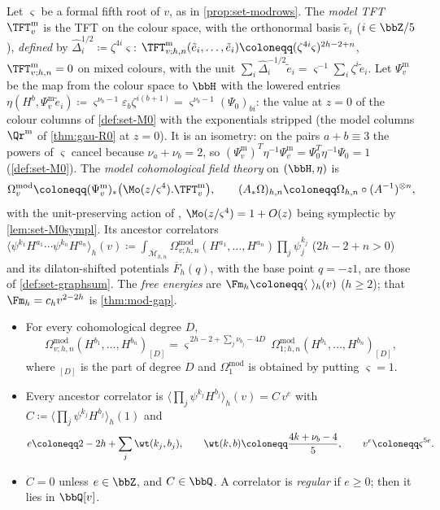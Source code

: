 \begin{defn}
\label{def:set-modcohft}
Let $\varsigma$ be a formal fifth root of $v$, as in \cref{prop:set-modrows}. The \emph{model TFT} $\TFT^{\mathrm m}_v$ is the TFT on the colour space, with the orthonormal basis $\tilde e_i$ ($i\in\bbZ/5$), \emph{defined} by $\hat\Delta_i^{1/2}\coloneqq\zeta^{4i}\varsigma$: $\TFT^{\mathrm m}_{v;h,n}(\tilde e_i,\dots,\tilde e_i)\coloneqq(\zeta^{4i}\varsigma)^{2h-2+n}$, $\TFT^{\mathrm m}_{v;h,n}=0$ on mixed colours, with the unit $\sum_i\hat\Delta_i^{-1/2}\tilde e_i=\varsigma^{-1}\sum_i\zeta^i\tilde e_i$. Let $\Psi^{\mathrm m}_v$ be the map from the colour space to $\bbH$ with the lowered entries $\eta(H^b,\Psi^{\mathrm m}_v\tilde e_i)\coloneqq\varsigma^{\nu_b-1}\varepsilon_b\zeta^{i(b+1)}=\varsigma^{\nu_b-1}(\Psi_0)_{bi}$: the value at $z=0$ of the colour columns of \cref{def:set-M0} with the exponentials stripped (the model columns $\Qr^{\mathrm m}$ of \cref{thm:gau-R0} at $z=0$). It is an isometry: on the pairs $a+b\equiv3$ the powers of $\varsigma$ cancel because $\nu_a+\nu_b=2$, so $(\Psi^{\mathrm m}_v)^T\eta^{-1}\Psi^{\mathrm m}_v=\Psi_0^T\eta^{-1}\Psi_0=1$ (\cref{def:set-M0}). The \emph{model cohomological field theory} on $(\bbH,\eta)$ is
\[
\Omega^{\mathrm{mod}}_v\coloneqq(\Psi^{\mathrm m}_v)_*\bigl(\Mo(z/\varsigma^4).\TFT^{\mathrm m}_v\bigr),\qquad(A_*\Omega)_{h,n}\coloneqq\Omega_{h,n}\circ(A^{-1})^{\otimes n},
\]
with the unit-preserving action of \cite[Defs.~2.5, 2.13]{PPZ15}, $\Mo(z/\varsigma^4)=1+O(z)$ being symplectic by \cref{lem:set-M0sympl}. Its ancestor correlators $\langle\psi^{k_1}H^{a_1}\cdots\psi^{k_n}H^{a_n}\rangle_h(v)\coloneqq\int_{\overline{\mathcal M}_{h,n}}\Omega^{\mathrm{mod}}_{v;h,n}(H^{a_1},\dots,H^{a_n})\prod_j\psi_j^{k_j}$ ($2h-2+n>0$) and its dilaton-shifted potentials $\overline F_h(q)$, with the base point $q=-z1$, are those of \cref{def:set-graphsum}. The \emph{free energies} are $\Fm_h\coloneqq\langle\ \rangle_h(v)$ ($h\geq2$); that $\Fm_h=c_hv^{2-2h}$ is \cref{thm:mod-gap}.
\end{defn}

\begin{lem}
\label{lem:set-modhom}
\begin{itemize}
\item[(a)] For every cohomological degree $D$,
\[
\Omega^{\mathrm{mod}}_{v;h,n}(H^{b_1},\dots,H^{b_n})_{[D]}=\varsigma^{\,2h-2+\sum_j\nu_{b_j}-4D}\,\Omega^{\mathrm{mod}}_{1;h,n}(H^{b_1},\dots,H^{b_n})_{[D]},
\]
where ${}_{[D]}$ is the part of degree $D$ and $\Omega^{\mathrm{mod}}_1$ is obtained by putting $\varsigma=1$.
\item[(b)] Every ancestor correlator is $\langle\prod_j\psi^{k_j}H^{b_j}\rangle_h(v)=C\,v^e$ with $C\coloneqq\langle\prod_j\psi^{k_j}H^{b_j}\rangle_h(1)$ and
\[
e\coloneqq2-2h+\sum_j\wt(k_j,b_j),\qquad\wt(k,b)\coloneqq\frac{4k+\nu_b-4}5,\qquad v^e\coloneqq\varsigma^{5e}.
\]
\item[(c)] $C=0$ unless $e\in\bbZ$, and $C\in\bbQ$. A correlator is \emph{regular} if $e\geq0$; then it lies in $\bbQ[v]$.
\end{itemize}
\end{lem}

